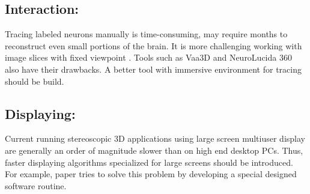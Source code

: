 \documentclass[10pt,twocolumn,letterpaper]{article}
\begin{document}
\subsection{Interaction:}Tracing labeled neurons manually is time-consuming, may require months to reconstruct even small portions of the brain. It is more challenging working with image slices with fixed viewpoint \cite{Usher2018}. Tools such as Vaa3D and NeuroLucida 360 also have their drawbacks. A better tool with immersive environment for tracing should be build.
\subsection{Displaying:}Current running stereoscopic 3D applications using large screen multiuser display are generally an order of magnitude slower than on high end desktop PCs. Thus, faster displaying algorithms specialized for large screens should be introduced. For example, paper \cite{Wiebrands2018} tries to solve this problem by developing a special designed software routine.

{\small


}
\end{document}
